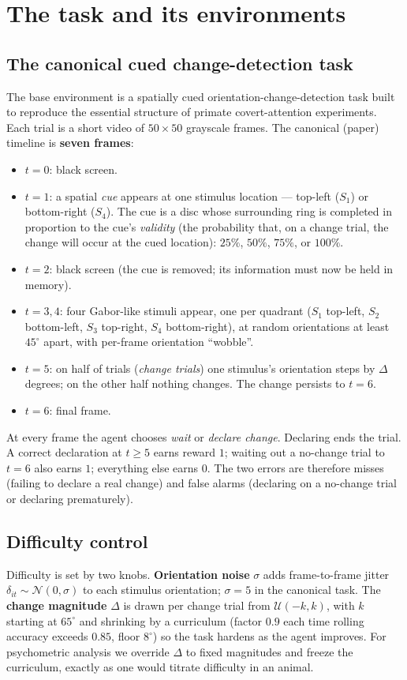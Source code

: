 \chapter{The task and its environments}
\label{ch:task}

\section{The canonical cued change-detection task}
The base environment is a spatially cued orientation-change-detection task built to
reproduce the essential structure of primate covert-attention experiments. Each trial is
a short video of $50\times50$ grayscale frames. The canonical (paper) timeline is
\textbf{seven frames}:
\begin{itemize}
\item $t=0$: black screen.
\item $t=1$: a spatial \emph{cue} appears at one stimulus location --- top-left ($S_1$) or
bottom-right ($S_4$). The cue is a disc whose surrounding ring is completed in proportion
to the cue's \emph{validity} (the probability that, on a change trial, the change will
occur at the cued location): $25\%$, $50\%$, $75\%$, or $100\%$.
\item $t=2$: black screen (the cue is removed; its information must now be held in memory).
\item $t=3,4$: four Gabor-like stimuli appear, one per quadrant ($S_1$ top-left, $S_2$
bottom-left, $S_3$ top-right, $S_4$ bottom-right), at random orientations at least
$45^\circ$ apart, with per-frame orientation ``wobble''.
\item $t=5$: on half of trials (\emph{change trials}) one stimulus's orientation steps by
$\Delta$ degrees; on the other half nothing changes. The change persists to $t=6$.
\item $t=6$: final frame.
\end{itemize}
At every frame the agent chooses \emph{wait} or \emph{declare change}. Declaring ends the
trial. A correct declaration at $t\geq5$ earns reward $1$; waiting out a no-change trial to
$t=6$ also earns $1$; everything else earns $0$. The two errors are therefore misses
(failing to declare a real change) and false alarms (declaring on a no-change trial or
declaring prematurely).

\section{Difficulty control}
Difficulty is set by two knobs. \textbf{Orientation noise} $\sigma$ adds frame-to-frame
jitter $\delta_{it}\sim\mathcal N(0,\sigma)$ to each stimulus orientation; $\sigma=5$ in
the canonical task. The \textbf{change magnitude} $\Delta$ is drawn per change trial from
$\mathcal U(-k,k)$, with $k$ starting at $65^\circ$ and shrinking by a curriculum (factor
$0.9$ each time rolling accuracy exceeds $0.85$, floor $8^\circ$) so the task hardens as
the agent improves. For psychometric analysis we override $\Delta$ to fixed magnitudes and
freeze the curriculum, exactly as one would titrate difficulty in an animal.

